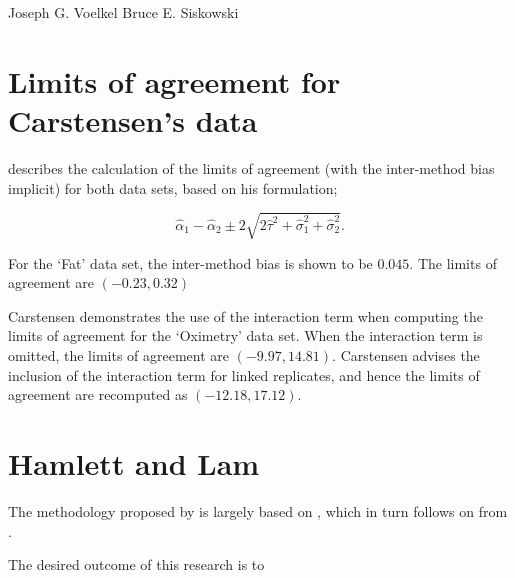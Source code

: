 \documentclass[12pt, a4paper]{report}
\theoremstyle{plain}
\theoremstyle{definition}
\theoremstyle{remark}
\begin{document}
Joseph G. Voelkel Bruce E. Siskowski 



\section{Limits of agreement for Carstensen's data}


\citet{bxc2008} describes the calculation of the limits of agreement (with the inter-method bias implicit) for both data sets, based on his formulation;

\[\hat{\alpha}_1 - \hat{\alpha}_2 \pm 2\sqrt{2\hat{\tau}^2 +\hat{\sigma}_1^2 +\hat{\sigma}_2^2 }.\]

For the `Fat' data set, the inter-method bias is shown to be $0.045$. The limits of agreement are $(-0.23 , 0.32)$

Carstensen demonstrates the use of the interaction term when computing the limits of agreement for the `Oximetry' data set. When the interaction term is omitted, the limits of agreement are $(-9.97, 14.81)$. Carstensen advises the inclusion of the interaction term for linked replicates, and hence the limits of agreement are recomputed as $(-12.18,17.12)$.






\newpage
\section{Hamlett and Lam}
The methodology proposed by \citet{Roy2009} is largely based on \citet{hamlett}, which in turn follows on from \citet{lam}.








The desired outcome of this research is to
\end{document}
